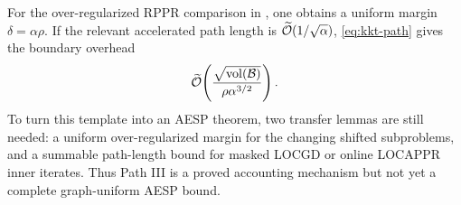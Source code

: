 For the over-regularized RPPR comparison in
\citet{fountoulakis2026complexity}, one obtains a uniform margin
$\delta=\alpha\rho$.  If the relevant accelerated path length is
$\widetilde{\mathcal{O}}(1/\sqrt\alpha)$, \cref{eq:kkt-path} gives the boundary overhead
\[
  \widetilde{\mathcal{O}}\!\left(
    \frac{\sqrt{\operatorname{vol}(\mathcal B)}}{\rho\alpha^{3/2}}
  \right).
\]
To turn this template into an AESP theorem, two transfer lemmas are still
needed: a uniform over-regularized margin for the changing shifted subproblems,
and a summable path-length bound for masked LOCGD or online LOCAPPR inner
iterates.  Thus Path III is a proved accounting mechanism but not yet a
complete graph-uniform AESP bound.
